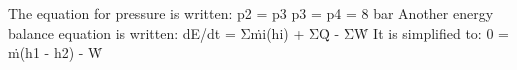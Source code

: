 The equation for pressure is written:  
p2 = p3  
p3 = p4 = 8 bar  
Another energy balance equation is written:  
dE/dt = Σṁi(hi) + ΣQ̇ - ΣẆ  
It is simplified to:  
0 = ṁ(h1 - h2) - Ẇ